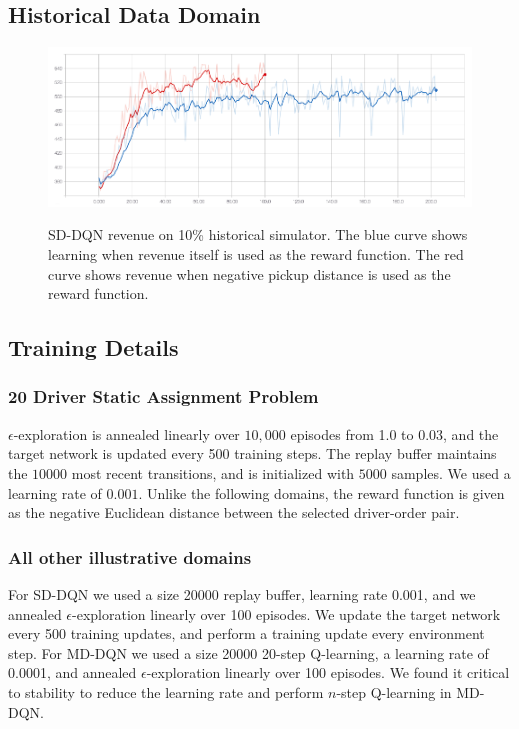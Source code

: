 \subsection{Historical Data Domain}

\begin{figure}[H]
\begin{floatrow}
\centering
\includegraphics[width=1.0\linewidth]{sections/mddqn/figures/revenues.png}\label{fig:revenues}

\caption{SD-DQN revenue on 10\% historical simulator. The blue curve shows learning when revenue itself is used as the reward function. The red curve shows revenue when negative pickup distance is used as the reward function.}
\end{floatrow}
\end{figure}

\subsection{Training Details}

\subsubsection{20 Driver Static Assignment Problem}
 $\epsilon$-exploration is annealed linearly over $10,000$ episodes from 1.0 to 0.03, and the target network is updated every 500 training steps. The replay buffer maintains the $10000$ most recent transitions, and is initialized with $5000$ samples. We used a learning rate of $0.001$. Unlike the following domains, the reward function is given as the negative Euclidean distance between the selected driver-order pair.

\subsubsection{All other illustrative domains}
For SD-DQN we used a size 20000 replay buffer, learning rate 0.001, and we annealed $\epsilon$-exploration linearly over 100 episodes. We update the target network every 500 training updates, and perform a training update every environment step. For MD-DQN we used a size 20000 20-step Q-learning, a learning rate of 0.0001, and annealed $\epsilon$-exploration linearly over 100 episodes. We found it critical to stability to reduce the learning rate and perform $n$-step Q-learning in MD-DQN.
